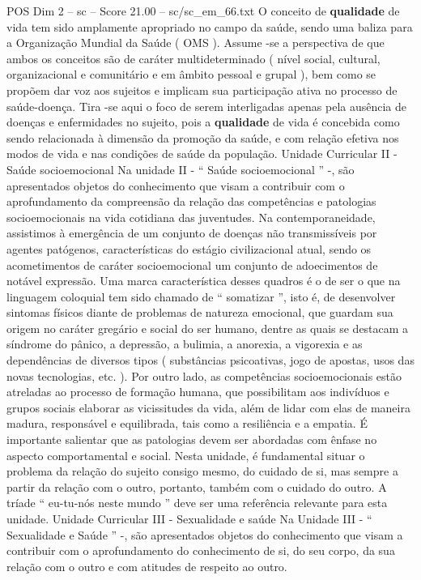 \begin{textsample}{POS Dim 2 – sc – Score 21.00 – sc/sc\_em\_66.txt}
O conceito de \textbf{qualidade} de vida tem sido amplamente apropriado no campo da saúde, sendo uma baliza para a Organização Mundial da Saúde ( OMS ).
Assume -se a perspectiva de que ambos os conceitos são de caráter multideterminado ( nível social, cultural, organizacional e comunitário e em âmbito pessoal e grupal ), bem como se propõem dar voz aos sujeitos e implicam sua participação ativa no processo de saúde-doença.
Tira -se aqui o foco de serem interligadas apenas pela ausência de doenças e enfermidades no sujeito, pois a \textbf{qualidade} de vida é concebida como sendo relacionada à dimensão da promoção da saúde, e com relação efetiva nos modos de vida e nas condições de saúde da população.
Unidade Curricular II - Saúde socioemocional Na unidade II - “ Saúde socioemocional ” -, são apresentados objetos do conhecimento que visam a contribuir com o aprofundamento da compreensão da relação das competências e patologias socioemocionais na vida cotidiana das juventudes.
Na contemporaneidade, assistimos à emergência de um conjunto de doenças não transmissíveis por agentes patógenos, características do estágio civilizacional atual, sendo os acometimentos de caráter socioemocional um conjunto de adoecimentos de notável expressão.
Uma marca característica desses quadros é o de ser o que na linguagem coloquial tem sido chamado de “ somatizar ”, isto é, de desenvolver sintomas físicos diante de problemas de natureza emocional, que guardam sua origem no caráter gregário e social do ser humano, dentre as quais se destacam a síndrome do pânico, a depressão, a bulimia, a anorexia, a vigorexia e as dependências de diversos tipos ( substâncias psicoativas, jogo de apostas, usos das novas tecnologias, etc. ).
Por outro lado, as competências socioemocionais estão atreladas ao processo de formação humana, que possibilitam aos indivíduos e grupos sociais elaborar as vicissitudes da vida, além de lidar com elas de maneira madura, responsável e equilibrada, tais como a resiliência e a empatia.
É importante salientar que as patologias devem ser abordadas com ênfase no aspecto comportamental e social.
Nesta unidade, é fundamental situar o problema da relação do sujeito consigo mesmo, do cuidado de si, mas sempre a partir da relação com o outro, portanto, também com o cuidado do outro.
A tríade “ eu-tu-nós neste mundo ” deve ser uma referência relevante para esta unidade.
Unidade Curricular III - Sexualidade e saúde Na Unidade III - “ Sexualidade e Saúde ” -, são apresentados objetos do conhecimento que visam a contribuir com o aprofundamento do conhecimento de si, do seu corpo, da sua relação com o outro e com atitudes de respeito ao outro.

\end{textsample}
